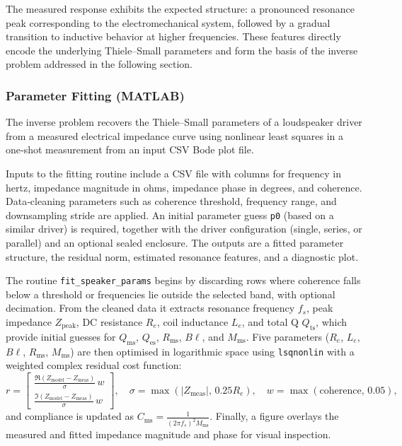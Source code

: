 The measured response exhibits the expected structure: a pronounced resonance peak corresponding to the electromechanical system, followed by a gradual transition to inductive behavior at higher frequencies. These features directly encode the underlying Thiele–Small parameters and form the basis of the inverse problem addressed in the following section.




\newpage
\subsubsection{Parameter Fitting (MATLAB)}

The inverse problem recovers the Thiele–Small parameters of a loudspeaker driver from a measured electrical impedance curve using nonlinear least squares in a one‑shot measurement from an input CSV Bode plot file.

Inputs to the fitting routine include a CSV file with columns for frequency in hertz, impedance magnitude in ohms, impedance phase in degrees, and coherence. Data‑cleaning parameters such as coherence threshold, frequency range, and downsampling stride are applied. An initial parameter guess \texttt{p0} (based on a similar driver) is required, together with the driver configuration (single, series, or parallel) and an optional sealed enclosure. The outputs are a fitted parameter structure, the residual norm, estimated resonance features, and a diagnostic plot.

The routine \texttt{fit\_speaker\_params} begins by discarding rows where coherence falls below a threshold or frequencies lie outside the selected band, with optional decimation. From the cleaned data it extracts resonance frequency \(f_s\), peak impedance \(Z_\mathrm{peak}\), DC resistance \(R_e\), coil inductance \(L_e\), and total Q \(Q_\mathrm{ts}\), which provide initial guesses for \(Q_\mathrm{ms}\), \(Q_\mathrm{es}\), \(R_\mathrm{ms}\), \(B\ell\), and \(M_\mathrm{ms}\). Five parameters (\(R_e\), \(L_e\), \(B\ell\), \(R_\mathrm{ms}\), \(M_\mathrm{ms}\)) are then optimised in logarithmic space using \texttt{lsqnonlin} with a weighted complex residual cost function:
\[
r =
\begin{bmatrix}
\frac{\Re(Z_\mathrm{model}-Z_\mathrm{meas})}{\sigma} \, w \\[2mm]
\frac{\Im(Z_\mathrm{model}-Z_\mathrm{meas})}{\sigma} \, w
\end{bmatrix}, \quad
\sigma = \max(|Z_\mathrm{meas}|,\,0.25 R_e), \quad
w = \max(\text{coherence},\,0.05),
\]
and compliance is updated as \(C_\mathrm{ms} = \frac{1}{(2\pi f_s)^2 M_\mathrm{ms}}\). Finally, a figure overlays the measured and fitted impedance magnitude and phase for visual inspection.



